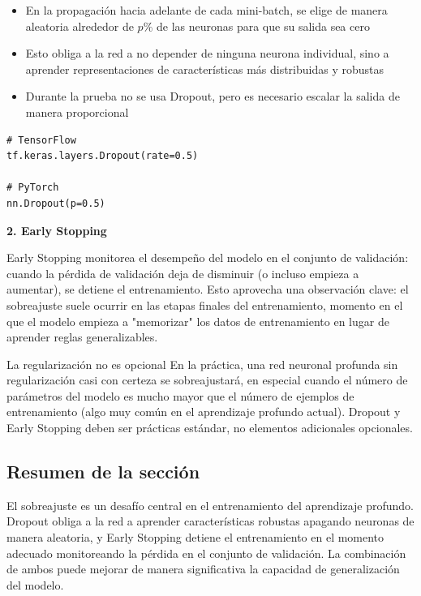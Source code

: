 \begin{itemize}
\item En la propagación hacia adelante de cada mini-batch, se elige de manera aleatoria alrededor de $p\%$ de las neuronas para que su salida sea cero
\item Esto obliga a la red a no depender de ninguna neurona individual, sino a aprender representaciones de características más distribuidas y robustas
\item Durante la prueba no se usa Dropout, pero es necesario escalar la salida de manera proporcional
\end{itemize}

\begin{lstlisting}[caption={Implementación en código de Dropout}]
# TensorFlow
tf.keras.layers.Dropout(rate=0.5)

# PyTorch
nn.Dropout(p=0.5)
\end{lstlisting}

\textbf{2. Early Stopping}

Early Stopping monitorea el desempeño del modelo en el conjunto de validación: cuando la pérdida de validación deja de disminuir (o incluso empieza a aumentar), se detiene el entrenamiento. Esto aprovecha una observación clave: el sobreajuste suele ocurrir en las etapas finales del entrenamiento, momento en el que el modelo empieza a "memorizar" los datos de entrenamiento en lugar de aprender reglas generalizables.

\begin{warningbox}{La regularización no es opcional}
En la práctica, una red neuronal profunda sin regularización casi con certeza se sobreajustará, en especial cuando el número de parámetros del modelo es mucho mayor que el número de ejemplos de entrenamiento (algo muy común en el aprendizaje profundo actual). Dropout y Early Stopping deben ser prácticas estándar, no elementos adicionales opcionales.
\end{warningbox}

\subsection{Resumen de la sección}

El sobreajuste es un desafío central en el entrenamiento del aprendizaje profundo. Dropout obliga a la red a aprender características robustas apagando neuronas de manera aleatoria, y Early Stopping detiene el entrenamiento en el momento adecuado monitoreando la pérdida en el conjunto de validación. La combinación de ambos puede mejorar de manera significativa la capacidad de generalización del modelo.
